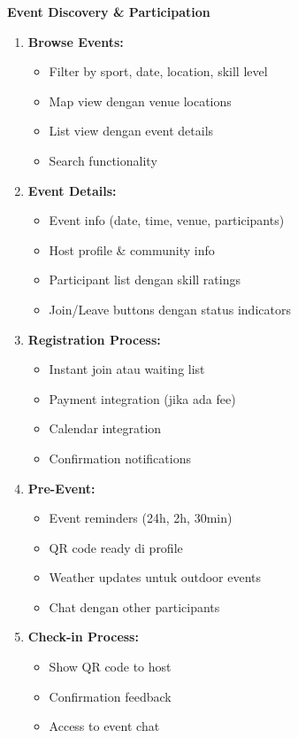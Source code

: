 \documentclass[12pt,a4paper]{article}
\begin{document}
\begin{implemented}
\textbf{Event Discovery \& Participation}
\begin{enumerate}
    \item \textbf{Browse Events:} 
    \begin{itemize}
        \item Filter by sport, date, location, skill level
        \item Map view dengan venue locations
        \item List view dengan event details
        \item Search functionality
    \end{itemize}
    \item \textbf{Event Details:}
    \begin{itemize}
        \item Event info (date, time, venue, participants)
        \item Host profile \& community info
        \item Participant list dengan skill ratings
        \item Join/Leave buttons dengan status indicators
    \end{itemize}
    \item \textbf{Registration Process:}
    \begin{itemize}
        \item Instant join atau waiting list
        \item Payment integration (jika ada fee)
        \item Calendar integration
        \item Confirmation notifications
    \end{itemize}
    \item \textbf{Pre-Event:}
    \begin{itemize}
        \item Event reminders (24h, 2h, 30min)
        \item QR code ready di profile
        \item Weather updates untuk outdoor events
        \item Chat dengan other participants
    \end{itemize}
    \item \textbf{Check-in Process:}
    \begin{itemize}
        \item Show QR code to host
        \item Confirmation feedback
        \item Access to event chat

\end{itemize}
\end{enumerate}
\end{implemented}
\end{document}
